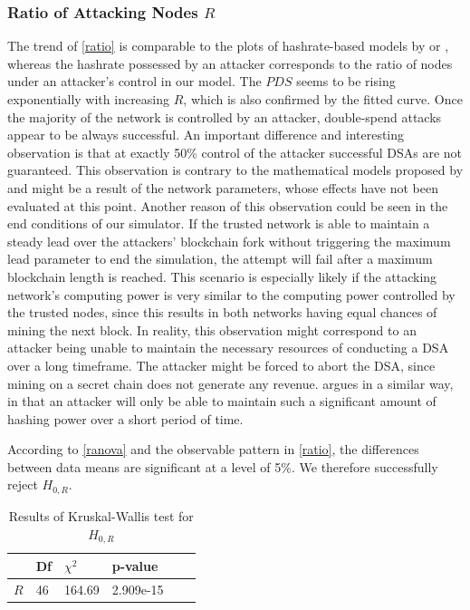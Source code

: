 \documentclass[a4paper,12pt,twoside]{report}
\begin{document}
\subsubsection{Ratio of Attacking Nodes $R$}
The trend of \autoref{ratio} is comparable to the plots of hashrate-based models by \cite{HBDSA} or \cite{DSAwithTime}, whereas the hashrate possessed by an attacker corresponds to the ratio of nodes under an attacker's control in our model. The $PDS$ seems to be rising exponentially with increasing $R$, which is also confirmed by the fitted curve. Once the majority of the network is controlled by an attacker, double-spend attacks appear to be always successful. An important difference and interesting observation is that at exactly 50\% control of the attacker successful DSAs are not guaranteed. This observation is contrary to the mathematical models proposed by \cite{nakamoto2008bitcoin,HBDSA,DSAwithTime} and might be a result of the network parameters, whose effects have not been evaluated at this point. Another reason of this observation could be seen in the end conditions of our simulator. If the trusted network is able to maintain a steady lead over the attackers' blockchain fork without triggering the maximum lead parameter to end the simulation, the attempt will fail after a maximum blockchain length is reached. This scenario is especially likely if the attacking network's computing power is very similar to the computing power controlled by the trusted nodes, since this results in both networks having equal chances of mining the next block. In reality, this observation might correspond to an attacker being unable to maintain the necessary resources of conducting a DSA over a long timeframe. The attacker might be forced to abort the DSA, since mining on a secret chain does not generate any revenue. \cite{longestchain} argues in a similar way, in that an attacker will only be able to maintain such a significant amount of hashing power over a short period of time. 

According to \autoref{ranova} and the observable pattern in \autoref{ratio}, the differences between data means are significant at a level of 5\%. We therefore successfully reject $H_{0,R}$.
\begin{table}[hb]
\centering
\begin{tabular}{|l|l|l|l|l|l|} \hline
& Df & $\chi^{2}$ & p-value \\ \hline
$R$ & 46 & 164.69 & 2.909e-15 \\ \hline
\end{tabular}
\caption{Results of Kruskal-Wallis test for $H_{0,R}$}
\label{ranova}
\end{table}
\end{document}
